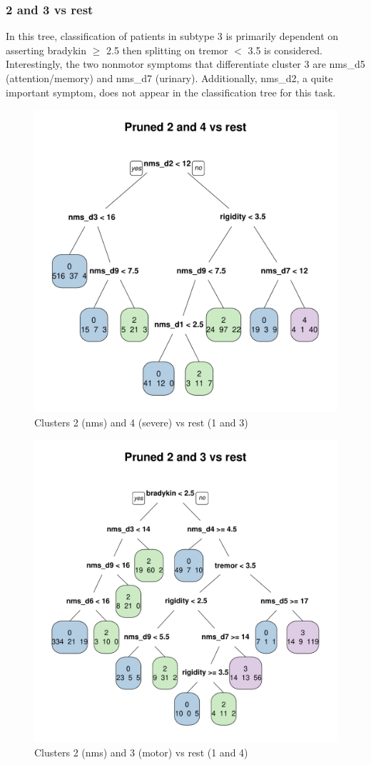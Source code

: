 \documentclass[10pt]{article}
\begin{document}
\begin{multicols}{2}
\subsubsection{2 and 3 vs rest}
In this tree, classification of patients in subtype 3 is primarily dependent on
asserting bradykin $\geq$ 2.5 then splitting on tremor $<$ 3.5 is considered.
Interestingly, the two nonmotor symptoms that differentiate cluster 3 are
nms\_d5 (attention/memory) and nms\_d7 (urinary). Additionally, nms\_d2, a
quite important symptom, does not appear in the classification tree for this
task.

\begin{figure}[H]
  \centering
  \includegraphics[width=0.75\linewidth]{dtree-2and4va-pruned.pdf}
  \caption{Clusters 2 (nms) and 4 (severe) vs rest (1 and 3)}
  \label{fig:dtree-2and4va-pruned}
\end{figure}

\begin{figure}[H]
  \centering
  \includegraphics[width=0.75\linewidth]{dtree-2and3va-pruned.pdf}
  \caption{Clusters 2 (nms) and 3 (motor) vs rest (1 and 4)}
  \label{fig:dtree-2and3va-pruned}
\end{figure}


\end{multicols}
\end{document}
